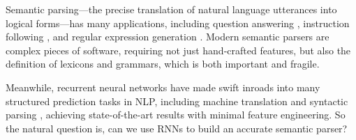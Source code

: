 \documentclass[11pt,letterpaper]{article}
\newcommand\pl[1]{\textcolor{red}{[PL: #1]}}
\newcommand\rj[1]{\textcolor{blue}{[RJ: #1]}}
\renewcommand\pl[1]{}
\renewcommand\rj[1]{}
\begin{document}
Semantic parsing---the precise translation of natural language utterances into 
logical forms---has many applications,
including question answering \cite{zelle96geoquery,zettlemoyer05ccg,zettlemoyer07relaxed,liang11dcs,berant2013freebase},
instruction following \cite{artzi2013weakly},
and regular expression generation \cite{kushman2013regex}.
Modern semantic parsers \cite{artzi2013uw,berant2013freebase} are complex pieces of software,
requiring not just hand-crafted features,
but also the definition of lexicons and grammars,
which is both important and fragile.
\rj{``which are''?  I'm not sure what is being called important and fragile}


Meanwhile, recurrent neural networks have made swift inroads into 
many structured prediction tasks in NLP,
including machine translation
\cite{sutskever2014sequence,bahdanau2014neural} and
syntactic parsing \cite{vinyals2015grammar,dyer2015transition},
achieving state-of-the-art results with minimal feature engineering.
So the natural question is, 
can we use RNNs to build an accurate semantic parser?  %

\end{document}
